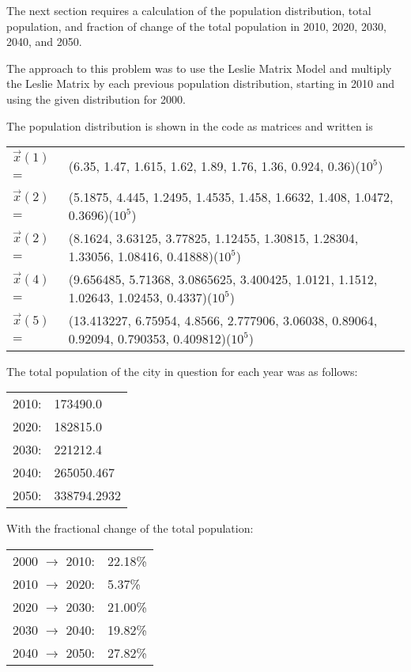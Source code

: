 \documentclass[letterpaper,12pt]{article}
\begin{document}
The next section requires a calculation of the population distribution, total
population, and fraction of change of the total population in 2010, 2020, 2030,
2040, and 2050. 

The approach to this problem was to use the Leslie Matrix Model and multiply the
Leslie Matrix by each previous population distribution, starting in 2010 and
using the given distribution for 2000.

The population distribution is shown in the code as matrices and written is

\vspace{11pt}

\begin{tabular}{l l}
$\vec{x}(1)$=&(6.35, 1.47, 1.615, 1.62, 1.89, 1.76, 1.36, 0.924, 0.36)($10^5$)\\
$\vec{x}(2)$=&(5.1875, 4.445, 1.2495, 1.4535, 1.458, 1.6632, 1.408, 1.0472, 0.3696)($10^5$)\\
$\vec{x}(2)$=&(8.1624, 3.63125, 3.77825, 1.12455, 1.30815, 1.28304, 1.33056, 1.08416, 0.41888)($10^5$)\\
$\vec{x}(4)$=&(9.656485, 5.71368, 3.0865625, 3.400425, 1.0121, 1.1512, 1.02643, 1.02453, 0.4337)($10^5$)\\
$\vec{x}(5)$=&(13.413227, 6.75954, 4.8566, 2.777906, 3.06038, 0.89064, 0.92094, 0.790353, 0.409812)($10^5$)
\end{tabular}

\vspace{11pt}

The total population of the city in question for each year was as follows:

\vspace{11pt}

\begin{tabular}{l l}
2010: & 173490.0 \\
2020: & 182815.0 \\
2030: & 221212.4 \\
2040: & 265050.467 \\
2050: & 338794.2932
\end{tabular}

\vspace{11pt}

With the fractional change of the total population:

\vspace{11pt}

\begin{tabular}{l l}
2000 $\to$ 2010: & 22.18\% \\
2010 $\to$ 2020: & 5.37\% \\
2020 $\to$ 2030: & 21.00\% \\
2030 $\to$ 2040: & 19.82\% \\
2040 $\to$ 2050: & 27.82\%
\end{tabular}
\end{document}
